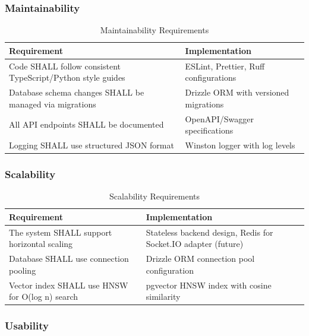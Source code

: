 \documentclass[11pt,a4paper]{article}
\begin{document}
\subsubsection{Maintainability}

\begin{table}[H]
\centering
\begin{tabular}{p{5cm}p{8cm}}
\toprule
\textbf{Requirement} & \textbf{Implementation} \\
\midrule
Code SHALL follow consistent TypeScript/Python style guides & ESLint, Prettier, Ruff configurations \\
Database schema changes SHALL be managed via migrations & Drizzle ORM with versioned migrations \\
All API endpoints SHALL be documented & OpenAPI/Swagger specifications \\
Logging SHALL use structured JSON format & Winston logger with log levels \\
\bottomrule
\end{tabular}
\caption{Maintainability Requirements}
\end{table}

\subsubsection{Scalability}

\begin{table}[H]
\centering
\begin{tabular}{p{5cm}p{8cm}}
\toprule
\textbf{Requirement} & \textbf{Implementation} \\
\midrule
The system SHALL support horizontal scaling & Stateless backend design, Redis for Socket.IO adapter (future) \\
Database SHALL use connection pooling & Drizzle ORM connection pool configuration \\
Vector index SHALL use HNSW for O(log n) search & pgvector HNSW index with cosine similarity \\
\bottomrule
\end{tabular}
\caption{Scalability Requirements}
\end{table}

\subsubsection{Usability}
\end{document}
